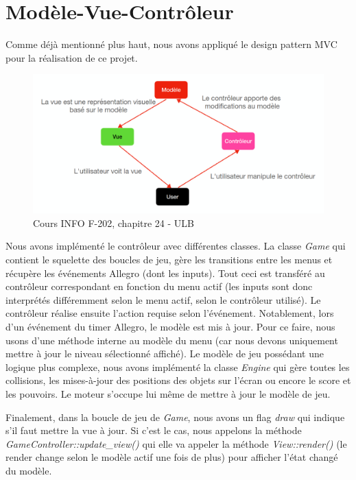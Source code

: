 \documentclass[utf8]{article}
\begin{document}
\section{Modèle-Vue-Contrôleur}
Comme déjà mentionné plus haut, nous avons appliqué le design pattern MVC pour la réalisation de ce projet.
    \begin{figure}[h]
        \centering
        \includegraphics[scale=0.35]{images/mvc.png}
        \caption{Cours INFO F-202, chapitre 24 - ULB}
    \end{figure}
Nous avons implémenté le contrôleur avec différentes classes. La classe \emph{Game} qui contient le squelette des boucles de jeu, gère les transitions entre les menus et récupère les événements Allegro (dont les inputs). Tout ceci est transféré au contrôleur correspondant en fonction du menu actif (les inputs sont donc interprétés différemment selon le menu actif, selon le contrôleur utilisé). Le contrôleur réalise ensuite l'action requise selon l'événement. Notablement, lors d'un événement du timer Allegro, le modèle est mis à jour. Pour ce faire, nous usons d'une méthode interne au modèle du menu (car nous devons uniquement mettre à jour le niveau sélectionné affiché). Le modèle de jeu possédant une logique plus complexe, nous avons implémenté la classe \emph{Engine} qui gère toutes les collisions, les mises-à-jour des positions des objets sur l'écran ou encore le score et les pouvoirs. Le moteur s'occupe lui même de mettre à jour le modèle de jeu.

Finalement, dans la boucle de jeu de \emph{Game}, nous avons un flag \emph{draw} qui indique s'il faut mettre la vue à jour. Si c'est le cas, nous appelons la méthode \emph{GameController::update\_view()} qui elle va appeler la méthode \emph{View::render()} (le render change selon le modèle actif une fois de plus) pour afficher l'état changé du modèle.
\end{document}
